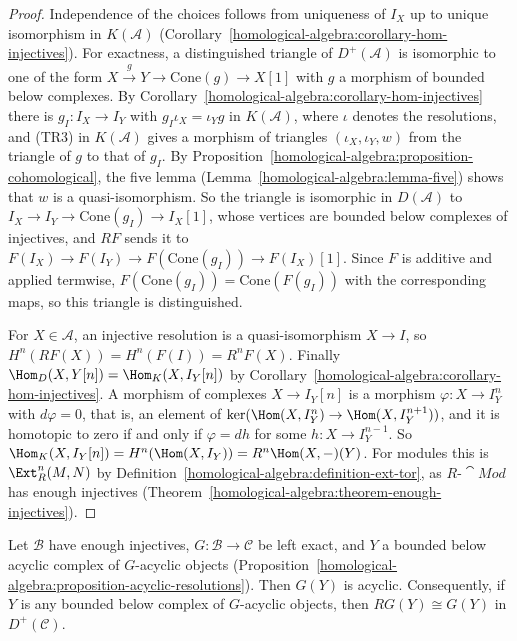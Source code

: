 \begin{proof}
Independence of the choices follows from uniqueness of $I_X$ up to unique isomorphism in $K(\mathcal{A})$
(Corollary~\ref{homological-algebra:corollary-hom-injectives}). For exactness, a distinguished triangle of $D^+(\mathcal{A})$ is isomorphic to one
of the form $X \xrightarrow{g} Y \to \mathrm{Cone}(g) \to X[1]$ with $g$ a morphism of bounded below complexes. By
Corollary~\ref{homological-algebra:corollary-hom-injectives} there is $g_I \colon I_X \to I_Y$ with $g_I\iota_X = \iota_Y g$ in $K(\mathcal{A})$, where
$\iota$ denotes the resolutions, and (TR3) in $K(\mathcal{A})$ gives a morphism of triangles $(\iota_X, \iota_Y, w)$ from the triangle of $g$ to that of
$g_I$. By Proposition~\ref{homological-algebra:proposition-cohomological}, the five lemma (Lemma~\ref{homological-algebra:lemma-five}) shows
that $w$ is a quasi-isomorphism. So the triangle is isomorphic in $D(\mathcal{A})$ to $I_X \to I_Y \to \mathrm{Cone}(g_I) \to I_X[1]$, whose vertices are
bounded below complexes of injectives, and $RF$ sends it to $F(I_X) \to F(I_Y) \to F(\mathrm{Cone}(g_I)) \to F(I_X)[1]$. Since $F$ is additive and applied
termwise, $F(\mathrm{Cone}(g_I)) = \mathrm{Cone}(F(g_I))$ with the corresponding maps, so this triangle is distinguished.

For $X \in \mathcal{A}$, an injective resolution is a quasi-isomorphism $X \to I$, so $H^n(RF(X)) = H^n(F(I)) = R^nF(X)$. Finally
$\Hom_D(X, Y[n]) = \Hom_K(X, I_Y[n])$ by Corollary~\ref{homological-algebra:corollary-hom-injectives}. A morphism of complexes $X \to I_Y[n]$ is a
morphism $\varphi \colon X \to I_Y^n$ with $d\varphi = 0$, that is, an element of $\ker(\Hom(X, I_Y^n) \to \Hom(X, I_Y^{n+1}))$, and it is homotopic to
zero if and only if $\varphi = dh$ for some $h \colon X \to I_Y^{n-1}$. So $\Hom_K(X, I_Y[n]) = H^n(\Hom(X, I_Y)) = R^n\Hom(X, -)(Y)$. For modules this
is $\Ext^n_R(M, N)$ by Definition~\ref{homological-algebra:definition-ext-tor}, as $R\text{-}\cat{Mod}$ has enough injectives
(Theorem~\ref{homological-algebra:theorem-enough-injectives}).
\end{proof}

\begin{lemma}\label{homological-algebra:lemma-acyclic-complexes}
Let $\mathcal{B}$ have enough injectives, $G \colon \mathcal{B} \to \mathcal{C}$ be left exact, and $Y$ a bounded below acyclic complex of
$G$-acyclic objects (Proposition~\ref{homological-algebra:proposition-acyclic-resolutions}). Then $G(Y)$ is acyclic.
Consequently, if $Y$ is any bounded below complex of $G$-acyclic objects, then $RG(Y) \cong G(Y)$ in $D^+(\mathcal{C})$.
\end{lemma}

